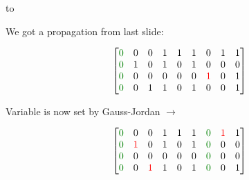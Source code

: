 \documentclass[aspectratio=196]{slides}
\def\TITLE#1{\hbox to \linewidth{\large #1\hfill}}
\def\BOTTOM{\vfill\newpage}
\def\SLIDE#1{\BOTTOM\TITLE{#1}}
\begin{document}
\vfill
\newpage
\SLIDE{CDCL(T) Gauss-Jordan Elimination: Propagation}
\vspace{2ex}

\begin{minipage}{0.2\linewidth}
\centering
We got a propagation from last slide:
\end{minipage}
\begin{minipage}{0.3\linewidth}
\[
\begin{bmatrix}
\color{darkgreen}0 &            0 &           0 & 1 & 1 & 1 &            0 & 1 & 1\\
\color{darkgreen}0 & 1 &           0 & 1 & 0 & 1 &            0 &            0 & 0\\
\color{darkgreen}0 &            0 &           0 & 0 & 0 & 0 & \color{red}1 &            0 & 1\\
\color{darkgreen}0 &            0 &1 & 1 & 0 & 1 &            0 &            0 & 1\\
\end{bmatrix}
\]
\end{minipage}
%
\begin{minipage}{0.2\linewidth}
\centering
Variable is now set by Gauss-Jordan $\rightarrow$
\end{minipage}
%
\begin{minipage}{0.3\linewidth}
\[
\begin{bmatrix}
\color{darkgreen}0 &            0 &           0 & 1 & 1 & 1 & \color{darkgreen}0 & \color{red}1 & 1\\
\color{darkgreen}0 & \color{red}1 &           0 & 1 & 0 & 1 & \color{darkgreen}0 & 0 & 0\\
\color{darkgreen}0 &            0 &           0 & 0 & 0 & 0 & \color{darkgreen}0 & 0 & 0\\
\color{darkgreen}0 &            0 &\color{red}1 & 1 & 0 & 1 & \color{darkgreen}0 & 0 & 1\\
\end{bmatrix}
\]
\end{minipage}
\end{document}
